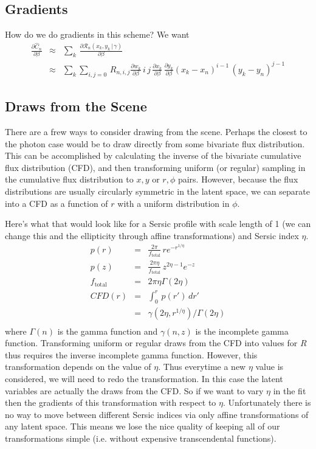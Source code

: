 \documentclass[modern]{aastex6}
\newcommand{\given}{\,|\,}
\newcommand{\countrate}{\hat{C}}
\newcommand{\prf}{\mathcal{R}}
\begin{document}
\subsection{Gradients}
How do we do gradients in this scheme?  We want 
\begin{eqnarray}
\frac{\partial\countrate_n}{\partial\beta} & \approx & \sum_k \, \frac{\partial\prf_n(x_k, y_k \given \gamma)}{\partial \beta} \nonumber \\
& \approx & \sum_k\sum_{i,j=0} \, R_{n, i, j} \frac{\partial w_k}{\partial \beta}\, i \, j \, \frac{\partial x_k}{\partial \beta}\, \frac{\partial y_k}{\partial \beta} (x_k - x_n)^{i-1} \, (y_k - y_n)^{j-1}
\end{eqnarray}


\subsection{Draws from the Scene}
There are a frew ways to consider drawing from the scene.
Perhaps the closest to the photon case would be to draw directly from some bivariate flux distribution.
This can be accomplished by calculating the inverse of the bivariate cumulative flux distribution (CFD),
 and then transforming uniform (or regular) sampling in the cumulative flux distribution to $x, y$ or $r, \phi$ pairs.
However, because the flux distributions are usually circularly symmetric in the latent space, we can separate into a CFD as a function of $r$ with a uniform distribution in $\phi$.

Here's what that would look like for a Sersic profile with scale length of 1 (we can change this and the ellipticity through affine transformations) and Sersic index $\eta$.
\begin{eqnarray}
 p(r) & = & \frac{2\pi}{f_{\mbox{total}}} \, r e^{-r^{1/\eta}} \nonumber \\
 p(z)  & = & \frac{2\pi \eta }{f_{\mbox{total}}} \, z^{2\eta - 1} e^{-z} \nonumber \\
f_{\mbox{total}} & = & 2\pi\eta \Gamma(2\eta) \nonumber \\ 
CFD(r) & = & \int_0^r \, p(r') \, dr'  \nonumber \\
   & = & \gamma(2\eta, r^{1/\eta}) / \Gamma(2\eta) \\
\end{eqnarray}
where $\Gamma(n)$ is the gamma function and $\gamma(n, z)$ is the incomplete gamma function.
Transforming uniform or regular draws from the CFD into values for $R$ thus requires the inverse incomplete gamma function.
However, this transformation depends on the value of $\eta$.
Thus everytime a new $\eta$ value is considered, we will need to redo the transformation.
In this case the latent variables are actually the draws from the CFD.
So if we want to vary $\eta$ in the fit then the gradients of this transformation with respect to $\eta$.
Unfortunately there is no way to move between different Sersic indices via only affine transformations of any latent space.
This means we lose the nice quality of keeping all of our transformations simple (i.e. without expensive transcendental functions).
\end{document}
